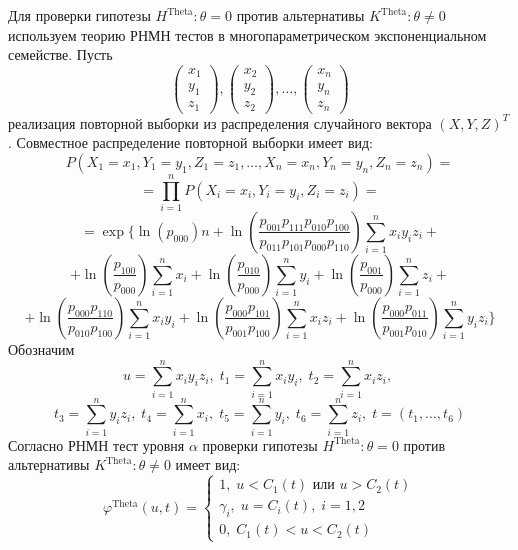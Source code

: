     Для проверки гипотезы $H^{\text{Theta}}:\theta=0$ 
    против альтернативы $K^{\text{Theta}}:\theta \neq 0$
    используем 
    теорию РНМН тестов \cite{Lehmann1986} в многопараметрическом 
    экспоненциальном семействе. Пусть
    $$
        \begin{pmatrix}
            x_1 \\
            y_1 \\
            z_1
        \end{pmatrix},
        \begin{pmatrix}
            x_2 \\
            y_2 \\
            z_2
        \end{pmatrix}, \ldots,
        \begin{pmatrix}
            x_n \\
            y_n \\
            z_n
        \end{pmatrix}
    $$ реализация
    повторной выборки  из распределения случайного вектора $(X,Y,Z)^T$.
    Совместное распределение повторной выборки имеет вид:
    $$
    P(X_1=x_1,Y_1=y_1,Z_1=z_1,\ldots,X_n=x_n,Y_n=y_n,Z_n=z_n)=
    $$
    $$
    =\prod_{i=1}^n P(X_i=x_i,Y_i=y_i,Z_i=z_i) =
    $$
    $$
     =\exp \Biggl\{\ln(p_{000})n + \ln  \left(\dfrac{p_{001}p_{111}p_{010}p_{100}}{p_{011}p_{101}p_{000}p_{110}}\right) \sum_{i=1}^n x_i y_i z_i +
     $$
        $$ +
            \ln\left(\dfrac{p_{100}}{p_{000}}\right) \sum_{i=1}^{n} x_i + \ln\left(\dfrac{p_{010}}{p_{000}}\right) \sum_{i=1}^{n} y_i +
            \ln\left(\dfrac{p_{001}}{p_{000}}\right) \sum_{i=1}^{n} z_i +
        $$
        $$
            +\ln \left(\dfrac{p_{000}p_{110}}{p_{010}p_{100}}\right) \sum_{i=1}^n x_i y_i +
            \ln \left(\dfrac{p_{000}p_{101}}{p_{001}p_{100}}\right) \sum_{i=1}^n x_i z_i +
            \ln \left(\dfrac{p_{000}p_{011}}{p_{001}p_{010}}\right) \sum_{i=1}^n y_i z_i \Biggr\}
        $$
    Обозначим 
    $$
        u = \sum_{i=1}^n x_i y_i z_i, \;
        t_1 = \sum_{i=1}^n x_i y_i, \;
        t_2 = \sum_{i=1}^n x_i z_i, \;
    $$
    $$
        t_3 = \sum_{i=1}^n y_i z_i, \;
        t_4 = \sum_{i=1}^n x_i, \;
        t_5 = \sum_{i=1}^n y_i, \;
        t_6 = \sum_{i=1}^n z_i, \;
        t=(t_1,\ldots,t_6)
    $$
    Согласно \cite{Lehmann1986} РНМН тест уровня $\alpha$ проверки гипотезы $H^{\text{Theta}}:\theta=0$ против альтернативы $K^{\text{Theta}}:\theta \neq 0$ имеет вид:
    $$
    \varphi^{\text{Theta}}(u,t)=\begin{cases}
        1, \; u<C_1(t) \text{ или } u>C_2(t)\\
        \gamma_i, \; u=C_i(t), \; i=1,2\\
        0, \; C_1(t)<u<C_2(t)
    \end{cases}
    $$
